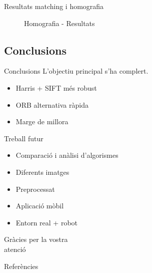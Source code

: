 \documentclass[xcolor=table, 11pt]{beamer}
\newcommand\tz{\fontsize{13}{15.6}\selectfont}
\begin{document}
	\begin{frame}{Resultats matching i homografia}
		\tz
		\begin{figure}[!htb]
			\par
			\caption{Homografia - Resultats}
		\end{figure}
	\end{frame}


	\begin{frame}[plain]
		\section{Conclusions}
	\end{frame}

	\begin{frame}{Conclusions}
		\tz
		L'objectiu principal s'ha complert.
		\vspace{1em}

		\begin{itemize}
			\item Harris + SIFT més robust
			\item ORB alternativa ràpida
			\item Marge de millora
		\end{itemize}
	\end{frame}

	\begin{frame}{Treball futur}
		\tz
		\begin{itemize}
			\item{Comparació i anàlisi d'algorismes}
			\item{Diferents imatges}
			\item{Preprocessat}
			\item{Aplicació mòbil}
			\item{Entorn real + robot}
		\end{itemize}
	\end{frame}

	\begin{frame}
		\Huge{Gràcies per la vostra\\atenció}
	\end{frame}

	\appendix

	\begin{frame}[allowframebreaks]{Referències}
		\printbibliography[heading=none]
	\end{frame}
\end{document}
